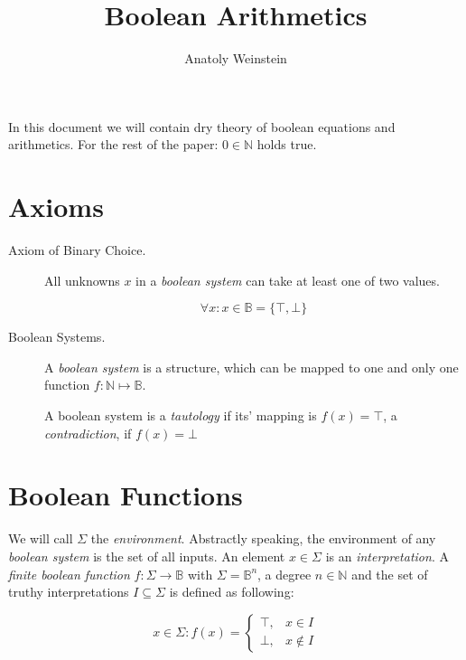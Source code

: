 \documentclass[12pt, letterpaper]{article}
\title{Boolean Arithmetics}
\author{Anatoly Weinstein}
\begin{document}
    \maketitle

    In this document we will contain dry theory of boolean equations
    and arithmetics. For the rest of the paper: $0 \in \mathbb{N}$
    holds true.

    \section{Axioms}

    \begin{description}
        \item[Axiom of Binary Choice.] All unknowns $x$ in a
        \emph{boolean system} can take at least one of two values.
        
        \[ \forall x: x \in \mathbb{B} =\{\top,\bot\} \]

        \item[Boolean Systems.] A \emph{boolean system} is a structure,
        which can be mapped to one and only one function $f:\mathbb{N}
        \mapsto\mathbb{B}$.
        
        A boolean system is a \emph{tautology} if its' mapping is
        $f(x)=\top$, a \emph{contradiction}, if $f(x)=\bot$
    \end{description}

    

    \section{Boolean Functions}

    We will call $\Sigma$ the \emph{environment}. Abstractly speaking, the 
    environment of any \emph{boolean system} is the set of all inputs.
    An element $x\in\Sigma$ is an \emph{interpretation}. A
    \emph{finite boolean function} $f:\Sigma\to\mathbb{B}$ with $\Sigma =
    \mathbb{B}^n$, a degree $n\in \mathbb{N}$ and the set of truthy
    interpretations $I \subseteq \Sigma$ is defined as following:

    \begin{equation}
        \nonumber
        x \in \Sigma: f(x) =
        \begin{cases}
            \top, & x \in I \\
            \bot, & x \not\in I
        \end{cases}
    \end{equation}
\end{document}
